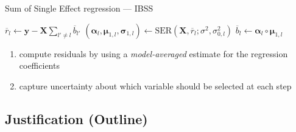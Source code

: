 \documentclass[10pt]{beamer}
\begin{document}
\begin{frame}{Sum of Single Effect regression --- \normalsize IBSS}
    \begin{algorithm}[H]
        \footnotesize
        \caption{Iterative Bayesian stepwise selection (IBSS)}\label{alg:ibss}
        \begin{algorithmic}[1]
            \Repeat
                \State $\overline{r}_l\gets \bm{y}-\bm{X}\sum_{l'\neq l}\overline{b}_{l'}$\Comment{\textcolor{gray}{expected residuals without $l$-th single effect}}
                \State $(\bm{\alpha}_l,\bm{\mu}_{1,l},\bm{\sigma}_{1,l})\gets\text{SER}(\bm{X},\overline{r}_l;\sigma^2,\sigma_{0,l}^2)$
                \State $\overline{b}_l \gets \bm{\alpha}_l\circ\bm{\mu}_{1,l}$\Comment{\textcolor{gray}{expected $l$-th effect's coefficient}}
                \EndFor
        \end{algorithmic}
    \end{algorithm}
    \begin{enumerate}
        \item compute residuals by using a \textit{model-averaged} estimate for the regression coefficients
        \item capture uncertainty about which variable should be selected at each step
    \end{enumerate}
\end{frame}



\subsection{Justification (Outline)}
\end{document}

